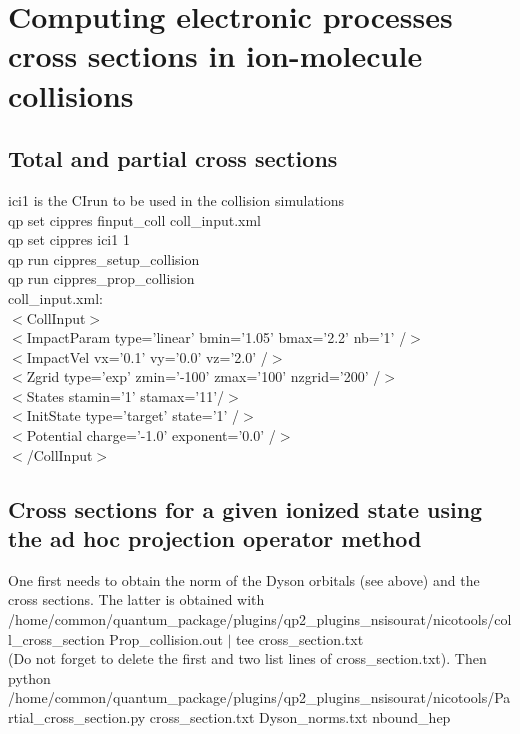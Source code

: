 \documentclass[a4paper, 10 pt]{report}
\begin{document}
\section{Computing electronic processes cross sections in ion-molecule collisions}

\subsection{Total and partial cross sections}

\noindent ici1 is the CIrun to be used in the collision simulations\\

\noindent qp set cippres finput\_coll coll\_input.xml \\
qp set cippres ici1 1\\
qp run cippres\_setup\_collision\\
qp run cippres\_prop\_collision\\

\noindent coll\_input.xml:\\

\noindent $<$CollInput$>$\\
$<$ImpactParam type='linear' bmin='1.05' bmax='2.2' nb='1' /$>$\\
$<$ImpactVel vx='0.1' vy='0.0' vz='2.0' /$>$\\
$<$Zgrid type='exp' zmin='-100' zmax='100' nzgrid='200' /$>$\\

$<$States stamin='1' stamax='11'/$>$\\

$<$InitState   type='target' state='1' /$>$\\
$<$Potential charge='-1.0' exponent='0.0' /$>$\\
$<$/CollInput$>$\\

\subsection{Cross sections for a given ionized state using the ad hoc projection operator method}

One first needs to obtain the norm of the Dyson orbitals (see above) and the cross sections. The latter is obtained with \\
/home/common/quantum\_package/plugins/qp2\_plugins\_nsisourat/nicotools/coll\_cross\_section Prop\_collision.out $|$ tee  cross\_section.txt\\
(Do not forget to delete the first and two list lines of cross\_section.txt). Then\\
python /home/common/quantum\_package/plugins/qp2\_plugins\_nsisourat/nicotools/Partial\_cross\_section.py cross\_section.txt Dyson\_norms.txt nbound\_hep \\
\end{document}
